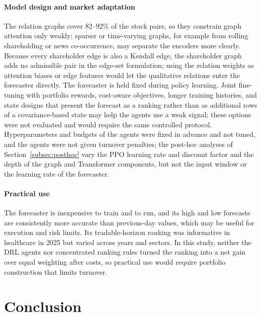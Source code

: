 {\paragraph{Model design and market adaptation}
The relation graphs cover 82--92\% of the stock pairs, so they constrain graph attention only weakly; sparser or time-varying graphs, for example from rolling shareholding or news co-occurrence, may separate the encoders more clearly. Because every shareholder edge is also a Kendall edge, the shareholder graph adds no admissible pair in the edge-set formulation; using the relation weights as attention biases or edge features would let the qualitative relations enter the forecaster directly. The forecaster is held fixed during policy learning. Joint fine-tuning with portfolio rewards, cost-aware objectives, longer training histories, and state designs that present the forecast as a ranking rather than as additional rows of a covariance-based state may help the agents use a weak signal; these options were not evaluated and would require the same controlled protocol. Hyperparameters and budgets of the agents were fixed in advance and not tuned, and the agents were not given turnover penalties; the post-hoc analyses of Section~\ref{subsec:posthoc} vary the PPO learning rate and discount factor and the depth of the graph and Transformer components, but not the input window or the learning rate of the forecaster.

\paragraph{Practical use}
The forecaster is inexpensive to train and to run, and its high and low forecasts are consistently more accurate than previous-day values, which may be useful for execution and risk limits. Its tradable-horizon ranking was informative in healthcare in 2025 but varied across years and sectors. In this study, neither the DRL agents nor concentrated ranking rules turned the ranking into a net gain over equal weighting after costs, so practical use would require portfolio construction that limits turnover.\par}

\section{Conclusion}\label{sec6}

